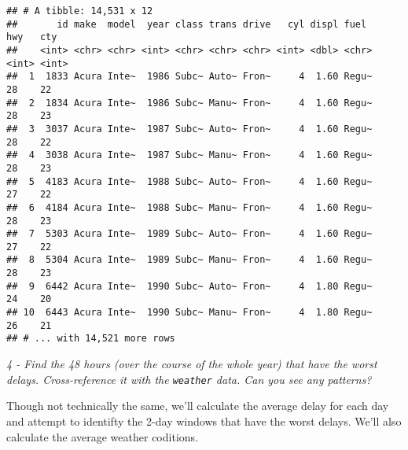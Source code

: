 \documentclass[]{article}
\theoremstyle{definition}
\theoremstyle{definition}
\theoremstyle{definition}
\theoremstyle{remark}
\begin{document}
\begin{verbatim}
## # A tibble: 14,531 x 12
##       id make  model  year class trans drive   cyl displ fuel    hwy   cty
##    <int> <chr> <chr> <int> <chr> <chr> <chr> <int> <dbl> <chr> <int> <int>
##  1  1833 Acura Inte~  1986 Subc~ Auto~ Fron~     4  1.60 Regu~    28    22
##  2  1834 Acura Inte~  1986 Subc~ Manu~ Fron~     4  1.60 Regu~    28    23
##  3  3037 Acura Inte~  1987 Subc~ Auto~ Fron~     4  1.60 Regu~    28    22
##  4  3038 Acura Inte~  1987 Subc~ Manu~ Fron~     4  1.60 Regu~    28    23
##  5  4183 Acura Inte~  1988 Subc~ Auto~ Fron~     4  1.60 Regu~    27    22
##  6  4184 Acura Inte~  1988 Subc~ Manu~ Fron~     4  1.60 Regu~    28    23
##  7  5303 Acura Inte~  1989 Subc~ Auto~ Fron~     4  1.60 Regu~    27    22
##  8  5304 Acura Inte~  1989 Subc~ Manu~ Fron~     4  1.60 Regu~    28    23
##  9  6442 Acura Inte~  1990 Subc~ Auto~ Fron~     4  1.80 Regu~    24    20
## 10  6443 Acura Inte~  1990 Subc~ Manu~ Fron~     4  1.80 Regu~    26    21
## # ... with 14,521 more rows
\end{verbatim}

\emph{4 - Find the 48 hours (over the course of the whole year) that
have the worst delays. Cross-reference it with the \texttt{weather}
data. Can you see any patterns?}

Though not technically the same, we'll calculate the average delay for
each day and attempt to identifty the 2-day windows that have the worst
delays. We'll also calculate the average weather coditions.
\end{document}
